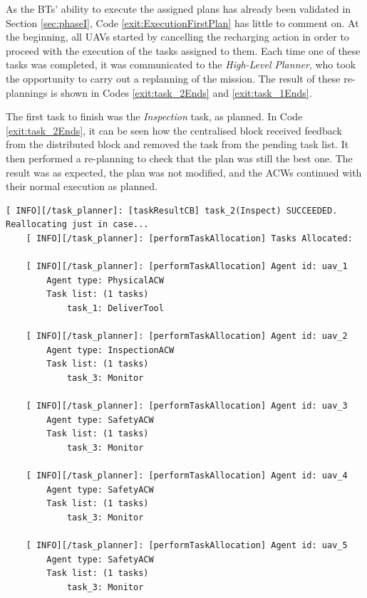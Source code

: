 As the \glspl{BT}' ability to execute the assigned plans has already been validated in Section \ref{sec:phaseI}, Code \ref{exit:ExecutionFirstPlan} has little to comment on. At the beginning, all \glspl{UAV} started by cancelling the recharging action in order to proceed with the execution of the tasks assigned to them. Each time one of these tasks was completed, it was communicated to the \emph{High-Level Planner}, who took the opportunity to carry out a replanning of the mission. The result of these re-plannings is shown in Codes \ref{exit:task_2Ends} and \ref{exit:task_1Ends}.

The first task to finish was the \emph{Inspection} task, as planned. In Code \ref{exit:task_2Ends}, it can be seen how the centralised block received feedback from the distributed block and removed the task from the pending task list. It then performed a re-planning to check that the plan was still the best one. The result was as expected, the plan was not modified, and the \glspl{ACW} continued with their normal execution as planned. 

\begin{lstlisting}[caption={Feedback messages printed after the \emph{Inspection} task ends}, breaklines=true, label=exit:task_2Ends]
    [ INFO][/task_planner]: [taskResultCB] task_2(Inspect) SUCCEEDED. Reallocating just in case...
    [ INFO][/task_planner]: [performTaskAllocation] Tasks Allocated:
    
    [ INFO][/task_planner]: [performTaskAllocation] Agent id: uav_1
        Agent type: PhysicalACW
        Task list: (1 tasks)
            task_1: DeliverTool
    
    [ INFO][/task_planner]: [performTaskAllocation] Agent id: uav_2
        Agent type: InspectionACW
        Task list: (1 tasks)
            task_3: Monitor
    
    [ INFO][/task_planner]: [performTaskAllocation] Agent id: uav_3
        Agent type: SafetyACW
        Task list: (1 tasks)
            task_3: Monitor
    
    [ INFO][/task_planner]: [performTaskAllocation] Agent id: uav_4
        Agent type: SafetyACW
        Task list: (1 tasks)
            task_3: Monitor
    
    [ INFO][/task_planner]: [performTaskAllocation] Agent id: uav_5
        Agent type: SafetyACW
        Task list: (1 tasks)
            task_3: Monitor
\end{lstlisting}

